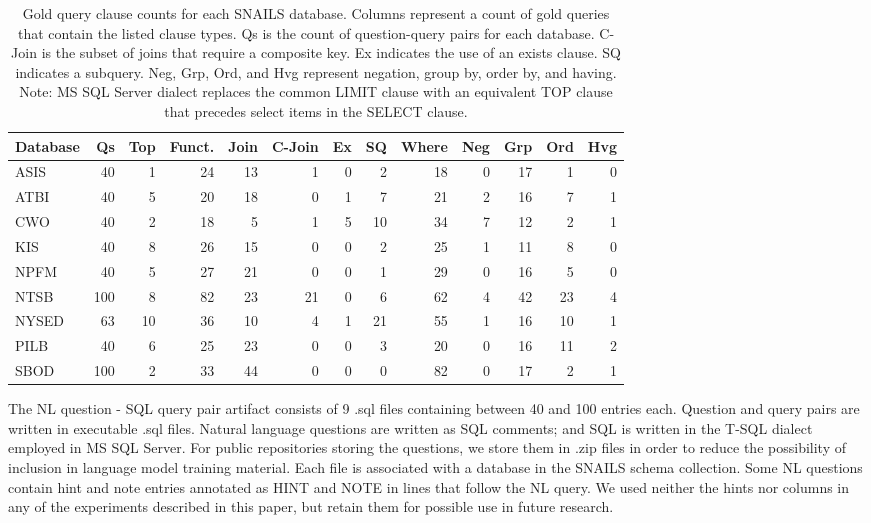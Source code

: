 \begin{table}[t]
  \centering
  \caption{Gold query clause counts for each SNAILS database. Columns represent a count of gold queries that contain the listed clause types. Qs is the count of question-query pairs for each database. C-Join is the subset of joins that require a composite key. Ex indicates the use of an exists clause. SQ indicates a subquery. Neg, Grp, Ord, and Hvg represent negation, group by, order by, and having. Note: MS SQL Server dialect replaces the common LIMIT clause with an equivalent TOP clause that precedes select items in the SELECT clause.}
  \begin{tabular}{lrrrrrrrrrrrr}
\toprule
Database & Qs & Top & Funct. & Join & C-Join & Ex & SQ & Where & Neg & Grp & Ord & Hvg \\
\midrule
ASIS & 40 & 1 & 24 & 13 & 1 & 0 & 2 & 18 & 0 & 17 & 1 & 0 \\
ATBI & 40 & 5 & 20 & 18 & 0 & 1 & 7 & 21 & 2 & 16 & 7 & 1 \\
CWO & 40 & 2 & 18 & 5 & 1 & 5 & 10 & 34 & 7 & 12 & 2 & 1 \\
KIS & 40 & 8 & 26 & 15 & 0 & 0 & 2 & 25 & 1 & 11 & 8 & 0 \\
NPFM & 40 & 5 & 27 & 21 & 0 & 0 & 1 & 29 & 0 & 16 & 5 & 0 \\
NTSB & 100 & 8 & 82 & 23 & 21 & 0 & 6 & 62 & 4 & 42 & 23 & 4 \\
NYSED & 63 & 10 & 36 & 10 & 4 & 1 & 21 & 55 & 1 & 16 & 10 & 1 \\
PILB & 40 & 6 & 25 & 23 & 0 & 0 & 3 & 20 & 0 & 16 & 11 & 2 \\
SBOD & 100 & 2 & 33 & 44 & 0 & 0 & 0 & 82 & 0 & 17 & 2 & 1 \\
\bottomrule
\end{tabular}

  \label{table:query-stats}
\end{table}

The NL question - SQL query pair artifact consists of 9 .sql files containing between 40 and 100 entries each.
Question and query pairs are written in executable .sql files.
Natural language questions are written as SQL comments; and SQL is written in the T-SQL dialect employed in MS SQL Server.
For public repositories storing the questions, we store them in .zip files in order to reduce the possibility of inclusion in language model training material.
Each file is associated with a database in the SNAILS schema collection.
Some NL questions contain hint and note entries annotated as HINT and NOTE in lines that follow the NL query.
We used neither the hints nor columns in any of the experiments described in this paper, but retain them for possible use in future research.

